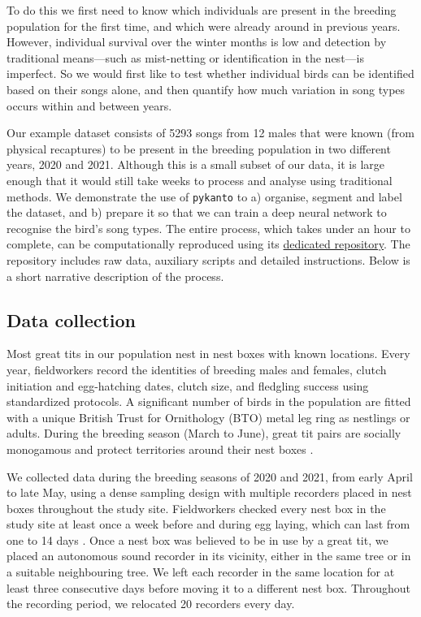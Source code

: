 To do this we first need to know which individuals are present in the breeding
population for the first time, and which were already around in previous years.
However, individual survival over the winter months is low and detection by
traditional means---such as mist-netting or identification in the nest---is
imperfect. So we would first like to test whether individual birds can be
identified based on their songs alone, and then quantify how much variation in
song types occurs within and between years.

Our example dataset consists of 5293 songs from 12 males that were known (from
physical recaptures) to be present in the breeding population in two different
years, 2020 and 2021. Although this is a small subset of our data, it is large
enough that it would still take weeks to process and analyse using traditional
methods. We demonstrate the use of \texttt{pykanto} to a) organise, segment and label the
dataset, and b) prepare it so that we can train a deep neural network to
recognise the bird's song types. The entire process, which takes under an hour to complete,
can be computationally reproduced using its
\href{https://github.com/nilomr/pykanto-example}{dedicated
repository}. The repository includes
raw data, auxiliary scripts and detailed instructions. Below is a short
narrative description of the process.

\subsection{Data collection}
Most great tits in our population nest in nest boxes with known locations. Every year, fieldworkers record the identities of breeding males and females, clutch initiation and egg-hatching dates, clutch size, and fledgling success using standardized protocols. A significant number of birds in the population are fitted with a unique British Trust for Ornithology (BTO) metal leg ring as nestlings or adults. During the breeding season (March to June), great tit pairs are socially monogamous and protect territories around their nest boxes \parencite{hinde1952}.

We collected data during the breeding seasons of 2020 and 2021, from early April to late May, using a dense sampling design with multiple recorders placed in nest boxes throughout the study site. Fieldworkers checked every nest box in the study site at least once a week before and during egg laying, which can last from one to 14 days \parencite{Perrins1965}. Once a nest box was believed to be in use by a great tit, we placed an autonomous sound recorder in its vicinity, either in the same tree or in a suitable neighbouring tree. We left each recorder in the same location for at least three consecutive days before moving it to a different nest box. Throughout the recording period, we relocated 20 recorders every day.

